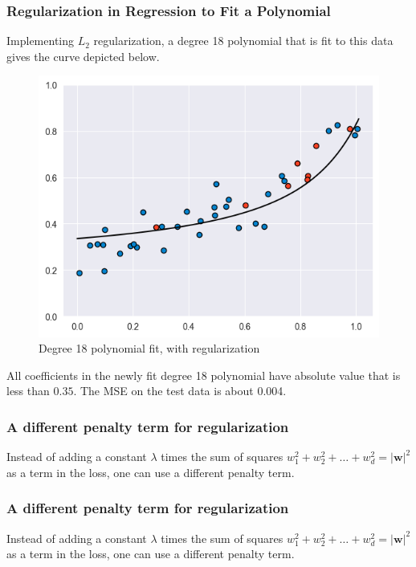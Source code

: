 \documentclass[smaller]{beamer}
\theoremstyle{example}
\begin{document}
\begin{frame}
    \frametitle{Regularization in Regression to Fit a Polynomial}
    Implementing $L_2$ regularization, a degree 18 polynomial that is fit to this data gives the curve depicted below. 
    
    \pause
    \begin{figure}
        \begin{center}
            \includegraphics[height=0.35\textheight]{../../Images/data_polynomial18_regfit.png}
        \end{center}
        \caption{Degree 18 polynomial fit, with regularization}
    \end{figure}
    \pause
    All coefficients in the newly fit degree 18 polynomial have absolute value that is less than $0.35$. The MSE on the test data is about 0.004.
\end{frame}

\begin{frame}
    \frametitle{A different penalty term for regularization}
    Instead of adding a constant $\lambda$ times the sum of squares $w_1^2+w_2^2+\ldots+w_d^2 = |\textbf{w}|^2$ as a term in the loss, one can use a different penalty term.
\end{frame}

\begin{frame}
    \frametitle{A different penalty term for regularization}
    Instead of adding a constant $\lambda$ times the sum of squares $w_1^2+w_2^2+\ldots+w_d^2 = |\textbf{w}|^2$ as a term in the loss, one can use a different penalty term.
\end{frame}
\end{document}
